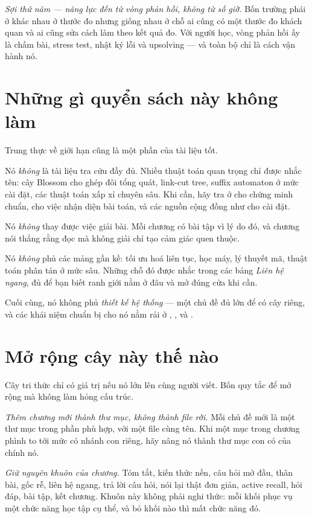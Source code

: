 \documentclass[algorithm.tex]{subfiles}
\begin{document}
\emph{Sợi thứ năm --- năng lực đến từ vòng phản hồi, không từ số giờ.} Bốn trường phái ở  khác nhau ở thước đo nhưng giống nhau ở chỗ ai cũng có một thước đo khách quan và ai cũng sửa cách làm theo kết quả đo. Với người học, vòng phản hồi ấy là chấm bài, stress test, nhật ký lỗi và upsolving --- và toàn bộ  chỉ là cách vận hành nó.

\section*{Những gì quyển sách này không làm}

Trung thực về giới hạn cũng là một phần của tài liệu tốt.

Nó \emph{không} là tài liệu tra cứu đầy đủ. Nhiều thuật toán quan trọng chỉ được nhắc tên: cây Blossom cho ghép đôi tổng quát, link-cut tree, suffix automaton ở mức cài đặt, các thuật toán xấp xỉ chuyên sâu. Khi cần, hãy tra ở \cite{clrs2022} cho chứng minh chuẩn, \cite{skiena2020} cho việc nhận diện bài toán, và các nguồn cộng đồng như \cite{cpalgorithms} cho cài đặt.

Nó \emph{không} thay được việc giải bài. Mỗi chương có bài tập vì lý do đó, và chương  nói thẳng rằng đọc mà không giải chỉ tạo cảm giác quen thuộc.

Nó \emph{không} phủ các mảng gần kề: tối ưu hoá liên tục, học máy, lý thuyết mã, thuật toán phân tán ở mức sâu. Những chỗ đó được nhắc trong các bảng \emph{Liên hệ ngang}, đủ để bạn biết ranh giới nằm ở đâu và mở đúng cửa khi cần.

Cuối cùng, nó không phủ \emph{thiết kế hệ thống} --- một chủ đề đủ lớn để có cây riêng, và các khái niệm chuẩn bị cho nó nằm rải ở , ,  và .

\section*{Mở rộng cây này thế nào}

Cây tri thức chỉ có giá trị nếu nó lớn lên cùng người viết. Bốn quy tắc để mở rộng mà không làm hỏng cấu trúc.

\emph{Thêm chương mới thành thư mục, không thành file rời.} Mỗi chủ đề mới là một thư mục  trong phần phù hợp, với một file  cùng tên. Khi một mục trong chương phình to tới mức có nhánh con riêng, hãy nâng nó thành thư mục con có  của chính nó.

\emph{Giữ nguyên khuôn của chương.} Tóm tắt, kiến thức nền, câu hỏi mở đầu, thân bài, gốc rễ, liên hệ ngang, trả lời câu hỏi, nói lại thật đơn giản, active recall, hỏi đáp, bài tập, kết chương. Khuôn này không phải nghi thức: mỗi khối phục vụ một chức năng học tập cụ thể, và bỏ khối nào thì mất chức năng đó.
\end{document}

